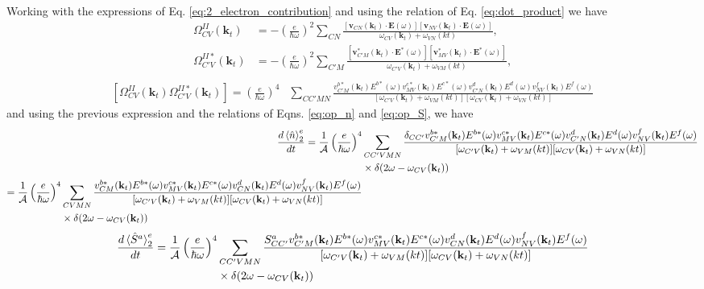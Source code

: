 \documentclass{article}
\newcommand{\kt}{\mathbf{k}_{t}}
\newcommand{\dw}{\delta(2\omega - \omega_{CV}(\kt))}
\begin{document}
Working with the expressions of Eq.
\eqref{eq:2_electron_contribution} and using the relation of Eq.
\eqref{eq:dot_product} we have
\begin{align*}\label{eq:omegaICV_omegaI*CpV}
\Omega^{II}_{CV}(\kt) &= - \left(\frac{e}{\hbar\omega}\right)^{2}
\sum_{CN} \frac{[\mathbf{v}_{CN}(\kt) \cdot \mathbf{E}(\omega)]
[\mathbf{v}_{NV}(\kt)\cdot\mathbf{E}(\omega)]}{\omega_{CV}(\kt)+\omega_{VN}(kt)},\\
\Omega^{II*}_{C'V}(\kt) &= - \left(\frac{e}{\hbar\omega}\right)^{2}
\sum_{C'M} \frac{[\mathbf{v}^{*}_{C'M}(\kt) \cdot \mathbf{E}^{*}(\omega)]
[\mathbf{v}^{*}_{MV}(\kt)\cdot\mathbf{E}^{*}(\omega)]}{\omega_{C'V}(\kt)+\omega_{VM}(kt)}, \\
\end{align*}
\begin{equation}
\begin{split}
[\Omega^{II}_{CV}(\kt)\Omega^{II*}_{C'V}(\kt)] = \left(\frac{e}{\hbar\omega}\right)^{4} &
\sum_{CC'MN} \frac{v^{b*}_{C'M}(\kt) E^{b*}(\omega)v^{c*}_{MV}(\kt) E^{c*}(\omega)
v^{d}_{C'N}(\kt) E^{d}(\omega)v^{f}_{NV}(\kt) E^{f}(\omega)}
{[\omega_{C'V}(\kt)+\omega_{VM}(kt)][\omega_{CV}(\kt)+\omega_{VN}(kt)]}
\end{split}
\end{equation}
and using the previous expression and the relations of Eqns. \eqref{eq:op_n} and
\eqref{eq:op_S}, we have 
\begin{align}
\frac{d\ev*{\hat{n}}^{e}_2}{dt} = \frac{1}{\mathcal{A}} \left(\frac{e}{\hbar\omega}\right)^{4}&
\sum_{CC'VMN} \frac{\delta_{CC'} v^{b*}_{C'M}(\kt) E^{b*}(\omega)v^{c*}_{MV}(\kt) E^{c*}(\omega)
v^{d}_{C'N}(\kt) E^{d}(\omega)v^{f}_{NV}(\kt) E^{f}(\omega)}
{[\omega_{C'V}(\kt)+\omega_{VM}(kt)][\omega_{CV}(\kt)+\omega_{VN}(kt)]} \nonumber \\
& \times \dw \nonumber \\
\begin{split}
= \frac{1}{\mathcal{A}} \left(\frac{e}{\hbar\omega}\right)^{4} &
\sum_{CVMN} \frac{v^{b*}_{CM}(\kt) E^{b*}(\omega)v^{c*}_{MV}(\kt) E^{c*}(\omega)
v^{d}_{CN}(\kt) E^{d}(\omega)v^{f}_{NV}(\kt) E^{f}(\omega)}
{[\omega_{C'V}(\kt)+\omega_{VM}(kt)][\omega_{CV}(\kt)+\omega_{VN}(kt)]} \\
& \times \dw \label{eq:2w_n_final}
\end{split}
\end{align}
\begin{equation}\label{eq:2w_S_final}
\begin{split}
\frac{d\ev*{\hat{S}^{a}}^{e}_2}{dt}= \frac{1}{\mathcal{A}} \left(\frac{e}{\hbar\omega}\right)^{4} &
\sum_{CC'VMN} \frac{S^{a}_{CC'} v^{b*}_{C'M}(\kt) E^{b*}(\omega)v^{c*}_{MV}(\kt) E^{c*}(\omega)
v^{d}_{CN}(\kt) E^{d}(\omega)v^{f}_{NV}(\kt) E^{f}(\omega)}
{[\omega_{C'V}(\kt)+\omega_{VM}(kt)][\omega_{CV}(\kt)+\omega_{VN}(kt)]} \\
& \times \dw 
\end{split}
\end{equation}
\end{document}
